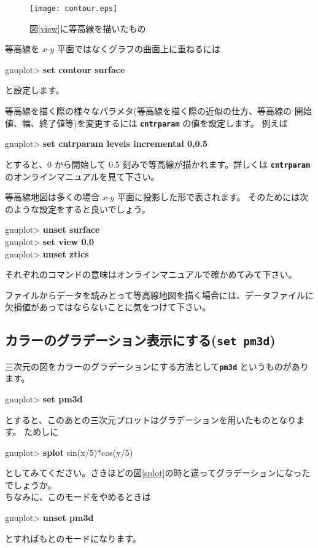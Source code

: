 \documentclass[a4j]{ujarticle} %
\newenvironment{terminal}{%
  \begin{center}
   \begin{minipage}{.8\textwidth}
    \setlength{\FrameSep}{.5\FrameSep}%
    \begin{framed}\ttfamily\small%
     \setlength\baselineskip{.85\baselineskip}%
}{%
    \end{framed}
   \end{minipage}
  \end{center}%
}
\begin{document}
\begin{figure}
\begin{center}
\begin{minipage}[hbtp]{0.49\textwidth}
\texttt{[image: contour.eps]}
\caption{図\ref{view}に等高線を描いたもの}
\label{contour}
\end{minipage}
\end{center}
\end{figure}

等高線を $x$-$y$ 平面ではなくグラフの曲面上に重ねるには
\begin{terminal}
gnuplot> {\bf set contour surface}
\end{terminal}
と設定します。

等高線を描く際の様々なパラメタ(等高線を描く際の近似の仕方、等高線の
開始値、幅、終了値等)を変更するには {\tt\bf cntrparam} の値を設定します。
例えば
\begin{terminal}
gnuplot> {\bf set cntrparam levels incremental 0,0.5}
\end{terminal}
とすると、0 から開始して 0.5 刻みで等高線が描かれます。詳しくは
{\tt\bf cntrparam} のオンラインマニュアルを見て下さい。

等高線地図は多くの場合 $x$-$y$ 平面に投影した形で表されます。
そのためには次のような設定をすると良いでしょう。
\begin{terminal}
gnuplot> {\bf unset surface} \\
gnuplot> {\bf set view 0,0} \\
gnuplot> {\bf unset ztics}
\end{terminal}
それぞれのコマンドの意味はオンラインマニュアルで確かめてみて下さい。

ファイルからデータを読みとって等高線地図を描く場合には、データファイルに
欠損値があってはならないことに気をつけて下さい。

\subsection{カラーのグラデーション表示にする({\tt\bf set pm3d})}
三次元の図をカラーのグラデーションにする方法として{\tt\bf pm3d} というものがあります。
\begin{terminal}
gnuplot> {\bf set pm3d}
\end{terminal}
とすると、このあとの三次元プロットはグラデーションを用いたものとなります。
ためしに
\begin{terminal}
gnuplot> {\bf splot} sin(x/5)*cos(y/5)
\end{terminal}
としてみてください。さきほどの図\ref{splot}の時と違ってグラデーションになったでしょうか。\\
ちなみに、このモードをやめるときは
\begin{terminal}
gnuplot> {\bf unset pm3d}
\end{terminal}
とすればもとのモードになります。
\end{document}
